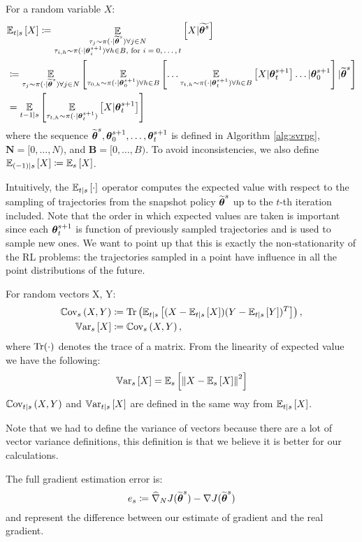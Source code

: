 \begin{definition}
	For a random variable $X$:
	\begin{align*}
	&\mathbb{E}_{t\vert s}\left[X\right] \coloneqq 
	\mathop{\mathbb{E}}_{\substack{\tau_j\sim\pi(\cdot\vert\wt{\vtheta}^s)\forall j \in N \\ \tau_{i,h}\sim\pi(\cdot\vert\vtheta^{s+1}_i) \forall h \in B, \text{ for $i=0,\dots,t$}}}{\left[X \vert \wt{\vtheta^s}\right]} \\
	&\coloneqq \EVV[\tau_j\sim\pi(\cdot\vert\wt{\vtheta}^s)\forall j \in N]{
		\EVV[\tau_{0,h}\sim\pi(\cdot\vert\vtheta_0^{s+1}) \forall h \in B]
		{\dots
			\EVV[\tau_{t,h}\sim\pi(\cdot\vert\vtheta_t^{s+1})\forall h \in B]
			{X\vert\vtheta_t^{s+1}}
			\dots
			\vert\vtheta_0^{s+1}}
		\vert\wt{\vtheta}^s}\\
	&= \EVV[t-1|s]{\EVV[\tau_{t,h}\sim \pi(\cdot|\vtheta^{s+1}_t)]{X|\vtheta^{s+1}_t}}
	\end{align*}
	where the sequence $\wt{\vtheta}^s,\vtheta_0^{s+1},\dots,\vtheta_t^{s+1}$ is defined in Algorithm \ref{alg:svrpg}, $\mathbf{N} = [0,\dots,N)$, and $\mathbf{B} = [0,\dots,B)$. To avoid inconsistencies, we also define $\Ets[(-1)]{X} \coloneqq \Es{X}$.
	
\end{definition}

Intuitively, the $\Ets{\cdot}$ operator computes the expected value with respect to the sampling of trajectories from the snapshot policy $\wt{\vtheta}^s$ up to the $t$-th iteration included. Note that the order in which expected values are taken is important since each $\vtheta_{t}^{s+1}$ is function of previously sampled trajectories and is used to sample new ones.
We want to point up that this is exactly the non-stationarity of the \acs{RL} problems: the trajectories sampled in a point have influence in all the point distributions of the future.

\begin{definition}\label{def:var}
	For random vectors X, Y:
	\begin{align*}
	\Covs{X}{Y} &\coloneqq \Tr\left(\Ets{(X-\Ets{X})(Y-\Ets{Y})^T}\right), \\
	\Vars{X} &\coloneqq \Covs{X}{Y},
	\end{align*}
	where $\Tr(\cdot)$ denotes the trace of a matrix. From the linearity of expected value we have the following:
	\begin{equation}\label{neweq:1}
	\Vars{X} = \Es{\norm[]{X-\Es{X}}^2}
	\end{equation}
	$\Covts[t]{X}{Y}$ and $\Varts[t]{X}$ are defined in the same way from $\Ets[t]{X}$.
\end{definition}
Note that we had to define the variance of vectors because there are a lot of vector variance definitions, this definition is that we  believe it is better for our calculations. 
\begin{definition}
	The full gradient estimation error is:
	\[
	e_s \coloneqq \gradApp{\wt{\vtheta}^s}{N} - \gradJ{\wt{\vtheta}^s} 
	\]
	and represent the difference between our estimate of gradient and the real gradient.
\end{definition}


